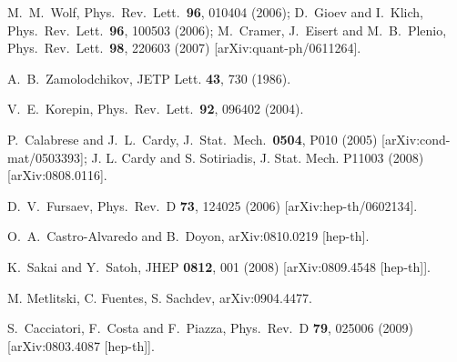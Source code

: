 \documentclass[11pt]{article}
\begin{document}
\begin{thebibliography}{99}
M.~M.~Wolf,
  Phys.\ Rev.\ Lett.\  {\bf 96}, 010404 (2006);
  D.~Gioev and I.~Klich,
  Phys.\ Rev.\ Lett.\  {\bf 96}, 100503 (2006);
  M.~Cramer, J.~Eisert and M.~B.~Plenio,
  Phys.\ Rev.\ Lett.\  {\bf 98}, 220603 (2007)
  [arXiv:quant-ph/0611264]. 

A.~B.~Zamolodchikov, JETP Lett. {\bf 43}, 730 (1986).

  V.~E.~Korepin,
  Phys.\ Rev.\ Lett.\  {\bf 92}, 096402 (2004).



  P.~Calabrese and J.~L.~Cardy,
  J.\ Stat.\ Mech.\  {\bf 0504}, P010 (2005)
  [arXiv:cond-mat/0503393]; 
 J. L. Cardy and S. Sotiriadis, J. Stat. Mech. P11003 (2008) [arXiv:0808.0116].






D.~V.~Fursaev,
  Phys.\ Rev.\ D {\bf 73}, 124025 (2006)
  [arXiv:hep-th/0602134].
 

  O.~A.~Castro-Alvaredo and B.~Doyon,
  arXiv:0810.0219 [hep-th].


  K.~Sakai and Y.~Satoh,
  JHEP {\bf 0812}, 001 (2008)
  [arXiv:0809.4548 [hep-th]].

M. Metlitski, C. Fuentes, S. Sachdev, arXiv:0904.4477. 

  S.~Cacciatori, F.~Costa and F.~Piazza,
  Phys.\ Rev.\  D {\bf 79}, 025006 (2009)
  [arXiv:0803.4087 [hep-th]].




\end{thebibliography}
\end{document}
